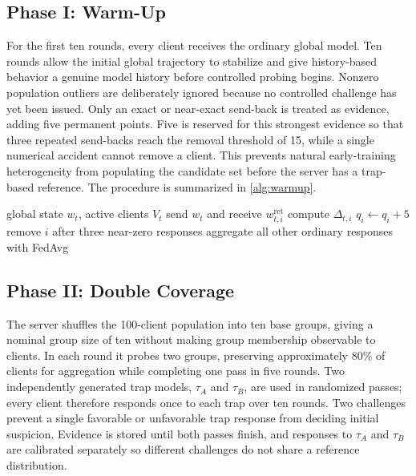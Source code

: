 \documentclass[conference]{IEEEtran}
\begin{document}
\subsection{Phase I: Warm-Up}
For the first ten rounds, every client receives the ordinary global model. Ten rounds allow the initial global trajectory to stabilize and give history-based behavior a genuine model history before controlled probing begins. Nonzero population outliers are deliberately ignored because no controlled challenge has yet been issued. Only an exact or near-exact send-back is treated as evidence, adding five permanent points. Five is reserved for this strongest evidence so that three repeated send-backs reach the removal threshold of 15, while a single numerical accident cannot remove a client. This prevents natural early-training heterogeneity from populating the candidate set before the server has a trap-based reference. The procedure is summarized in \autoref{alg:warmup}.

\begin{algorithm}[t]
\caption{Phase I: warm-up}
\label{alg:warmup}
\begin{algorithmic}[1]
\Require global state $w_t$, active clients $V_t$
 \State send $w_t$ and receive $w^{\mathrm{ret}}_{t,i}$
 \State compute $\Delta_{t,i}$
   \State $q_i\gets q_i+5$
 \EndIf
\EndFor
\State remove $i$ after three near-zero responses
\State aggregate all other ordinary responses with FedAvg
\end{algorithmic}
\end{algorithm}

\subsection{Phase II: Double Coverage}
The server shuffles the 100-client population into ten base groups, giving a nominal group size of ten without making group membership observable to clients. In each round it probes two groups, preserving approximately 80\% of clients for aggregation while completing one pass in five rounds. Two independently generated trap models, $\tau_A$ and $\tau_B$, are used in randomized passes; every client therefore responds once to each trap over ten rounds. Two challenges prevent a single favorable or unfavorable trap response from deciding initial suspicion. Evidence is stored until both passes finish, and responses to $\tau_A$ and $\tau_B$ are calibrated separately so different challenges do not share a reference distribution.
\end{document}
